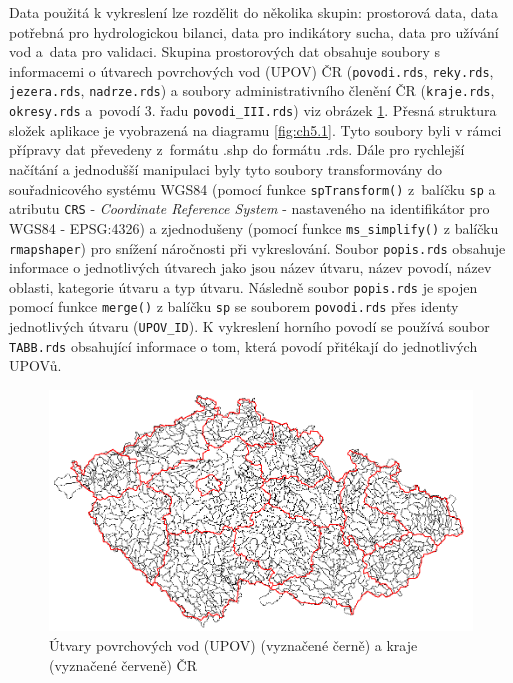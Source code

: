 \documentclass[12pt,]{article}
\begin{document}
\qquad Data použitá k vykreslení lze rozdělit do několika skupin:
prostorová data, data potřebná pro hydrologickou bilanci, data pro
indikátory sucha, data pro užívání vod a~data pro validaci. Skupina
prostorových dat obsahuje soubory s informacemi o útvarech povrchových
vod (UPOV) ČR (\texttt{povodi.rds}, \texttt{reky.rds},
\texttt{jezera.rds}, \texttt{nadrze.rds}) a soubory administrativního
členění ČR (\texttt{kraje.rds}, \texttt{okresy.rds} a~povodí 3. řadu
\texttt{povodi\_III.rds}) viz obrázek \ref{fig:ch5.0}. Přesná struktura
složek aplikace je vyobrazená na diagramu \ref{fig:ch5.1}. Tyto soubory
byli v rámci přípravy dat převedeny z~formátu .shp do formátu .rds. Dále
pro rychlejší načítání a jednodušší manipulaci byly tyto soubory
transformovány do souřadnicového systému WGS84 (pomocí funkce
\texttt{spTransform()} z~balíčku \texttt{sp} a atributu \texttt{CRS} -
\emph{Coordinate Reference System} - nastaveného na identifikátor pro
WGS84 - EPSG:4326) a zjednodušeny (pomocí funkce \texttt{ms\_simplify()}
z balíčku \texttt{rmapshaper}) pro snížení náročnosti při vykreslování.
Soubor \texttt{popis.rds} obsahuje informace o jednotlivých útvarech
jako jsou název útvaru, název povodí, název oblasti, kategorie útvaru a
typ útvaru. Následně soubor \texttt{popis.rds} je spojen pomocí funkce
\texttt{merge()} z balíčku \texttt{sp} se souborem \texttt{povodi.rds}
přes identy jednotlivých útvaru (\texttt{UPOV\_ID}). K vykreslení
horního povodí se používá soubor \texttt{TABB.rds} obsahující informace
o tom, která povodí přitékají do jednotlivých UPOVů.

\begin{figure}[H]
      \includegraphics[width=\textwidth]{fig/povodi-kraje}
      \caption{Útvary povrchových vod (UPOV) (vyznačené černě) a kraje (vyznačené červeně) ČR}
      \label{fig:ch5.0}
\end{figure}
\end{document}
